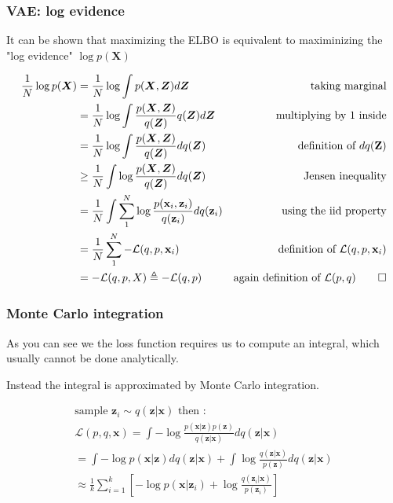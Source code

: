 \documentclass[final]{beamer}
\newcommand{\X}{\mathbf{X}}
\newcommand{\x}{\mathbf{x}}
\newcommand{\Z}{\mathbf{Z}}
\newcommand{\z}{\mathbf{z}}
\newcommand{\LL}{\mathcal{L}}
\newcommand{\bv}[1]{\boldsymbol{#1}}
\begin{document}
\begin{frame}
\frametitle{VAE: log evidence}

It can be shown that maximizing the ELBO is equivalent to 
maximinizing the "log evidence" $\log p(\X)$

{\tiny
\begin{equation}
\label{eq:elbo}
\begin{aligned}
\frac{1}{N} \log p(\bv{X}) &= \frac{1}{N} \log \int p(\bv{X},\bv{Z}) d\bv{Z} 
& \text{taking marginal} \\
& = \frac{1}{N} \log \int \frac{p(\bv{X},\bv{Z})}{q(\bv{Z})} q(\bv{Z})d\bv{Z} 
& \text{multiplying by 1 inside}\\
&=  \frac{1}{N} \log \int \frac{p(\bv{X},\bv{Z})}{q(\bv{Z})}dq(\bv{Z}) 
& \text{definition of } dq(\Z)\\
&\geq  \frac{1}{N} \int \log \frac{p(\bv{X},\bv{Z})}{q(\bv{Z})}dq(\bv{Z}) 
& \text{Jensen inequality}\\
&= \frac{1}{N} \int \sum_1^N \log \frac{p(\x_i, \z_i)}{q(\z_i)}dq(\z_i) 
& \text{using the iid property}\\
&= \frac{1}{N} \sum_1^N - \LL(q,p,\x_i)
& \text{definition of } \LL(q,p,\x_i)\\
& = -\mathcal{L}(q,p,X) \triangleq -\mathcal{L}(q,p)
& \text{again definition of } \LL(p,q) \qed
\end{aligned}
\end{equation}
}
\end{frame}

\begin{frame}
\frametitle{Monte Carlo integration}
As you can see we the loss function requires us to compute an integral, which
usually cannot be done analytically.

Instead the integral is approximated by Monte Carlo integration.

{\small
\begin{equation}
\begin{aligned}
\text{sample  } \z_i \sim q(\z | \x) \text{   then :}\\
\LL(p,q,\x) = 
\int - \log \frac{p(\x|\z)p(\z)}{q(\z|\x)}dq(\z|\x) \\
= \int -\log p(\x|\z)dq(\z|\x) + 
\int \log \frac{q(\z|\x)}{p(\z)}dq(\z|\x) \\
\approx \frac{1}{k} \sum_{i=1}^k [-\log p(\x|\z_i)
+ \log \frac{q(\z_i|\x)}{p(\z_i)} ]
\label{eq:elbomc}
\end{aligned}
\end{equation}
}

\end{frame}
\end{document}
